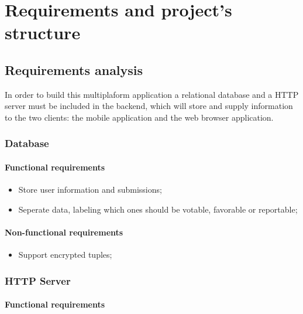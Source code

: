 %
%

\chapter{Requirements and project's structure}

\section{Requirements analysis}

In order to build this multiplaform application a relational database and a HTTP server must be included
in the backend, which will store and supply information to the two clients: the mobile application and the web browser application.

\subsection{Database}

\subsubsection{Functional requirements}

\begin{itemize}
    \item Store user information and submissions;
    \item Seperate data, labeling which ones should be votable, favorable or reportable;
\end{itemize}

\subsubsection{Non-functional requirements}

\begin{itemize}
    \item Support encrypted tuples;
\end{itemize}

\subsection{HTTP Server}

\subsubsection{Functional requirements}

